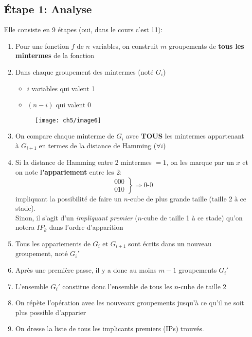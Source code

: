 \subsection{Étape 1: Analyse}
\label{subsec:analyse}
Elle consiste en 9 étapes (oui, dans le cours c'est 11):
\begin{enumerate}
	\item Pour une fonction $f$ de $n$ variables, on construit $m$ groupements de \textbf{tous les mintermes} de la fonction
	\item Dans chaque groupement des mintermes (noté $G_i$)
	\begin{itemize}
		\item $i$ variables qui valent 1
		\item $(n-i)$ qui valent 0
	\end{itemize}
	\begin{figure}[H]
		\centering
		\texttt{[image: ch5/image6]}
	\end{figure}
	\item On compare chaque minterme de $G_i$ avec \textbf{TOUS} les mintermes appartenant à $G_{i+1}$ en termes de la distance de Hamming ($\forall i$)
	\item Si la distance de Hamming entre 2 mintermes $=1$, on les marque par un $x$  et on note \textbf{l'appariement} entre les 2:
	\begin{equation}
		\left.
			\begin{array}{r}
				000\\
				010
			\end{array}
		\right\}\Rightarrow 0\text{-}0
	\end{equation}
	impliquant la possibilité de faire un $n$-cube de plus grande taille (taille 2 à ce stade).\\
	Sinon, il s'agit d'un \textit{impliquant premier} ($n$-cube de taille 1 à ce stade) qu'on notera $IP_k$ dans l'ordre d'apparition
	\item Tous les appariements de $G_i$ et $G_{i+1}$ sont écrits dans un nouveau groupement, noté $G_i'$
	\item Après une première passe, il y a donc au moins $m-1$ groupements $G_i'$
	\item L'ensemble $G_i'$ constitue donc l'ensemble de tous les $n$-cube de taille 2
	\item On répète l'opération avec les nouveaux groupements jusqu'à ce qu'il ne soit plus possible d'apparier
	\item On dresse la liste de tous les implicants premiers (IPs) trouvés.
\end{enumerate}
